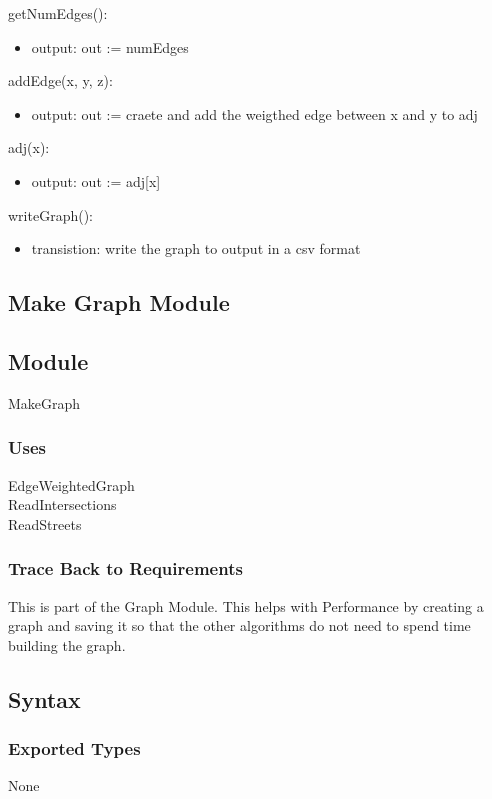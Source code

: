 \documentclass[12pt]{article}
\begin{document}
\noindent getNumEdges():
\begin{itemize}
    \item output: out := numEdges
\end{itemize}

\noindent addEdge(x, y, z):
\begin{itemize}
    \item output: out := craete and add the weigthed edge between x and y to adj
\end{itemize}

\noindent adj(x):
\begin{itemize}
    \item output: out := adj[x]
\end{itemize}

\noindent writeGraph():
\begin{itemize}
    \item transistion: write the graph to output in a csv format
\end{itemize}

\newpage
\subsection{Make Graph Module}
\subsection*{Module}
MakeGraph

\subsubsection*{Uses}
EdgeWeightedGraph\\
ReadIntersections\\
ReadStreets

\subsubsection*{Trace Back to Requirements}
This is part of the Graph Module. This helps with Performance by creating a graph and saving it so that the other algorithms do not need to spend time building the graph.

\subsection*{Syntax}
\subsubsection*{Exported Types}
None
\end{document}
